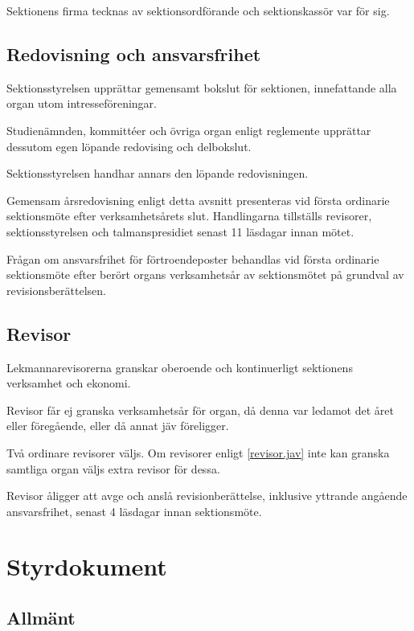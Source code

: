 \documentclass{styrdokument}
\begin{document}
\? Sektionens firma tecknas av sektionsordförande och sektionskassör var för
sig.

\subsection{Redovisning och ansvarsfrihet} \label{arsredovisning}

\? Sektionsstyrelsen upprättar gemensamt bokslut för sektionen, innefattande alla organ utom intresseföreningar.

\? Studienämnden, kommittéer och övriga organ enligt reglemente upprättar dessutom egen löpande redovising och delbokslut.

\? Sektionsstyrelsen handhar annars den löpande redovisningen.

\? Gemensam årsredovisning enligt detta avsnitt presenteras vid första ordinarie sektionsmöte efter verksamhetsårets slut.
Handlingarna tillställs revisorer, sektionsstyrelsen och talmanspresidiet senast 11 läsdagar innan mötet.

\? Frågan om ansvarsfrihet för förtroendeposter behandlas vid första ordinarie sektionsmöte efter berört organs verksamhetsår av sektionsmötet på grundval av revisionsberättelsen.

\subsection{Revisor}

\? Lekmannarevisorerna granskar oberoende och kontinuerligt sektionens verksamhet och ekonomi.

\? Revisor får ej granska verksamhetsår för organ, då denna var ledamot det året eller föregående, eller då annat jäv föreligger.
\label{revisor.jav}

\? Två ordinare revisorer väljs.
Om revisorer enligt \cref{revisor.jav} inte kan granska samtliga organ väljs extra revisor för dessa.

\? Revisor åligger att avge och anslå revisionberättelse, inklusive yttrande angående ansvarsfrihet, senast 4 läsdagar innan sektionsmöte.

\section{Styrdokument}
\subsection{Allmänt}
\end{document}
